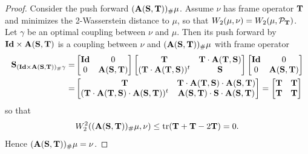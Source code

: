 \documentclass{amsart}
\numberwithin{equation}{section}
\newcommand\cP{{\mathcal P}}
\newcommand\bA{{\bf A}}
\newcommand\bS{{\bf S}}
\newcommand\bT{{\bf T}}
\newcommand\id{{\operatorname{\bf Id}}}
\newcommand\tr{{\operatorname{tr}}}
\theoremstyle{plain}
\theoremstyle{definition}
\begin{document}
\begin{proof}
Consider the push forward $(\bA(\bS, \bT))_{\#}\mu$. Assume $\nu$ has frame operator $\bT$ and minimizes the 2-Wasserstein distance to $\mu$, so that $W_2(\mu, \nu)=W_2(\mu, \cP_{\bT})$. 
Let $\gamma$ be an optimal coupling between $\nu$ and $\mu$. Then its 
push forward by $\id \times \bA(\bS, \bT)$ is a coupling between $\nu$ and $(\bA(\bS, \bT))_{\#}\mu$ with frame operator 
\[ 
\begin{split}
{\bf S}_{({\bf \id} \times \bA(\bS, \bT))_{\#}\gamma}=&\begin{bmatrix}
{\bf \id} & 0 \\
0 & \bA(\bS, \bT)
\end{bmatrix}
\begin{bmatrix}
\bT & \bT \cdot \bA(\bT, \bS) \\
(\bT \cdot \bA(\bT, \bS))^t & \bS
\end{bmatrix}
\begin{bmatrix}
{\bf \id} & 0 \\
0 & \bA(\bS, \bT)
\end{bmatrix}
\\
=&
\begin{bmatrix}
\bT & \bT \cdot \bA(\bT, \bS) \cdot \bA(\bS, \bT) \\
(\bT\cdot \bA(\bT, \bS) \cdot \bA(\bS, \bT))^t & \bA(\bS, \bT) \cdot \bS \cdot \bA(\bS, \bT) 
\end{bmatrix}
=
\begin{bmatrix}
\bT & \bT  \\
\bT & \bT 
\end{bmatrix}
\end{split}
\]
so that 
\[ W^2_2( (\bA(\bS, \bT))_{\#}\mu, \nu) \leq \tr (\bT + \bT - 2 \bT)=0. 
\]
Hence $ (\bA(\bS, \bT))_{\#}\mu=\nu$. 



\end{proof}

\end{document}
